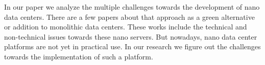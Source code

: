 

In our paper we analyze the multiple challenges towards the development of nano data centers. There are a few papers about that approach as a  green alternative or addition to monolithic data centers. These works include the technical and non-technical issues towards these nano servers. But nowadays, nano data center platforms are not yet in practical use. In our research we figure out the challenges towards the implementation of such a platform.